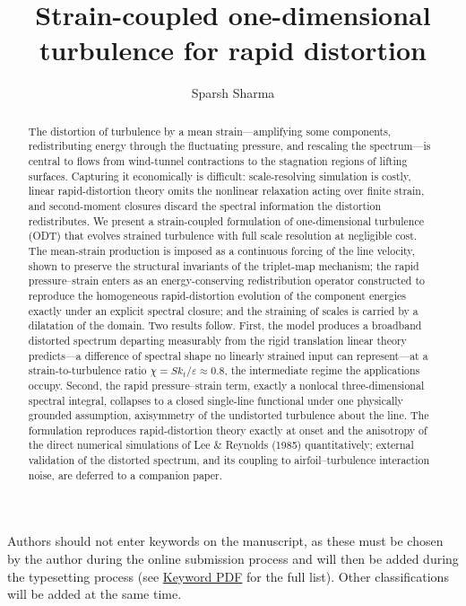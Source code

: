 \documentclass[lineno]{JFM-FLM_Au}
\title{Strain-coupled one-dimensional turbulence for rapid distortion}
\author{Sparsh Sharma\aff{1}}
\affiliation{\aff{1}German Aerospace Center (DLR), 38108 Braunschweig, Germany}
\newcounter{assumption}
\begin{document}
\maketitle

\begin{abstract}
The distortion of turbulence by a mean strain---amplifying some components,
redistributing energy through the fluctuating pressure, and rescaling the
spectrum---is central to flows from wind-tunnel contractions to the stagnation
regions of lifting surfaces. Capturing it economically is difficult:
scale-resolving simulation is costly, linear rapid-distortion theory omits the
nonlinear relaxation acting over finite strain, and second-moment closures
discard the spectral information the distortion redistributes. We present a
strain-coupled formulation of one-dimensional turbulence (ODT) that evolves
strained turbulence with full scale resolution at negligible cost. The
mean-strain production is imposed as a continuous forcing of the line velocity,
shown to preserve the structural invariants of the triplet-map mechanism; the
rapid pressure--strain enters as an energy-conserving redistribution operator
constructed to reproduce the homogeneous rapid-distortion evolution of the
component energies exactly under an explicit spectral closure; and the straining
of scales is carried by a dilatation of the domain. Two results follow. First,
the model produces a broadband distorted spectrum departing measurably from the
rigid translation linear theory predicts---a difference of spectral shape no
linearly strained input can represent---at a strain-to-turbulence ratio
$\chi=Sk_t/\varepsilon\approx0.8$, the intermediate regime the applications
occupy. Second, the rapid pressure--strain term, exactly a nonlocal
three-dimensional spectral integral, collapses to a closed single-line
functional under one physically grounded assumption, axisymmetry of the
undistorted turbulence about the line. The formulation reproduces rapid-distortion
theory exactly at onset and the anisotropy of the direct numerical
simulations of Lee \& Reynolds (1985) quantitatively; external validation of the
distorted spectrum, and its coupling to airfoil--turbulence interaction noise,
are deferred to a companion paper.
\end{abstract}

\begin{keywords}
Authors should not enter keywords on the manuscript, as these must be chosen by the author during the online submission process and will then be added during the typesetting process (see \href{https://www.cambridge.org/core/services/aop-file-manager/file/61436b61ff7f3cfab749ce3a/JFM-Keywords-Sept-2021.pdf.}{Keyword PDF} for the full list).  Other classifications will be added at the same time.
\end{keywords}
\end{document}
